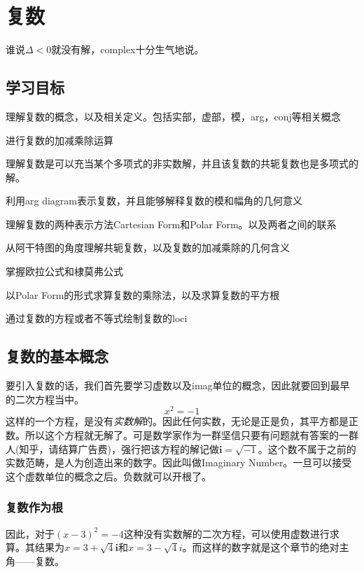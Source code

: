 \chapter{复数}
谁说$\Delta < 0$就没有解，\gls{complex}十分生气地说。

\section*{学习目标}
\begin{todolist}
\item 理解复数的概念，以及相关定义。包括实部，虚部，模，\gls{arg}，\gls{conj}等相关概念
\item 进行复数的加减乘除运算
\item 理解复数是可以充当某个多项式的非实数解，并且该复数的共轭复数也是多项式的解。
\item 利用\gls{arg diagram}表示复数，并且能够解释复数的模和幅角的几何意义
\item 理解复数的两种表示方法Cartesian Form和Polar Form。以及两者之间的联系
\item 从阿干特图的角度理解共轭复数，以及复数的加减乘除的几何含义
\item 掌握欧拉公式和棣莫弗公式
\item 以Polar Form的形式求算复数的乘除法，以及求算复数的平方根
\item 通过复数的方程或者不等式绘制复数的\gls{loci}
\end{todolist}
\clearpage

\section{复数的基本概念}
要引入复数的话，我们首先要学习虚数以及\gls{imag}单位的概念，因此就要回到最早的二次方程当中。
\[
	x^2=-1
\]
这样的一个方程，是没有\emph{实数解}的。因此任何实数，无论是正是负，其平方都是正数。所以这个方程就无解了。可是数学家作为一群坚信只要有问题就有答案的一群人(知乎，请结算广告费)，强行把该方程的解记做$\mathbf{i}=\sqrt{-1}$。这个数不属于之前的实数范畴，是人为创造出来的数字。因此叫做Imaginary Number。一旦可以接受这个虚数单位的概念之后。负数就可以开根了。

\subsection*{复数作为根}
因此，对于$(x-3)^2=-4$这种没有实数解的二次方程，可以使用虚数进行求算。其结果为$x=3+\sqrt{4}\mathbf{i}$和$x=3-\sqrt{4}i$。而这样的数字就是这个章节的绝对主角——复数。

